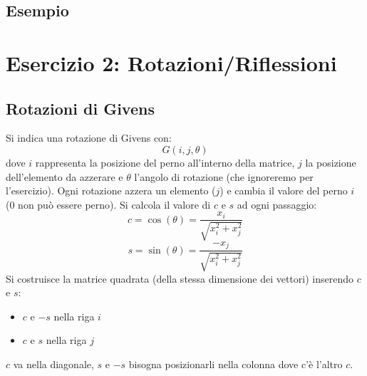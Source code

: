 \documentclass[10pt]{article}
\begin{document}
\subsection*{Esempio}

\newpage
\section{Esercizio 2: Rotazioni/Riflessioni}
\subsection{Rotazioni di Givens}
Si indica una rotazione di Givens con:
\begin{equation*}
    G(i,j,\theta)
\end{equation*}
dove $i$ rappresenta la posizione del perno all'interno della matrice, $j$ la posizione dell'elemento da azzerare e $\theta$ l'angolo di rotazione (che ignoreremo per l'esercizio). Ogni rotazione azzera un elemento ($j$) e cambia il valore del perno $i$ (0 non può essere perno). Si calcola il valore di $c$ e $s$ ad ogni passaggio:
\begin{equation*}
    c = \cos(\theta)=\frac{x_{i}}{\sqrt{x_{i}^{2}+x_{j}^{2}}}
\end{equation*}
\begin{equation*}
    s = \sin(\theta)=\frac{-x_{j}}{\sqrt{x_{i}^{2}+x_{j}^{2}}}
\end{equation*}
Si costruisce la matrice quadrata (della stessa dimensione dei vettori) inserendo $c$ e $s$:
\begin{itemize}
    \item $c$ e $-s$ nella riga $i$
    \item $c$ e $s$ nella riga $j$ 
\end{itemize}
$c$ va nella diagonale, $s$ e $-s$ bisogna posizionarli nella colonna dove c'è l'altro $c$.
\end{document}
